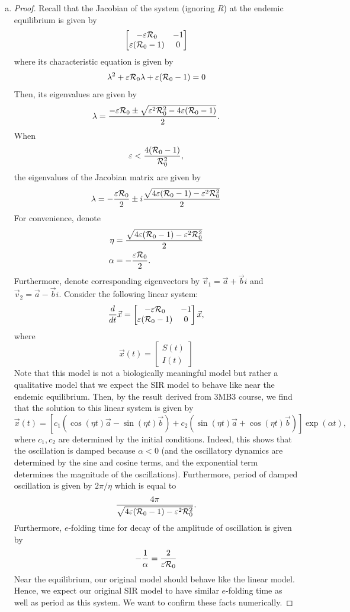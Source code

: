 \documentclass[12pt]{article}\usepackage[]{graphicx}\usepackage[]{color}
\begin{document}
\begin{enumerate}[(a)]
\item \SIRi
{\color{blue}\begin{proof}{\color{magenta}
Recall that the Jacobian of the system (ignoring $R$) at the endemic equilibrium is given by
$$
\begin{bmatrix}
- \varepsilon {\cal R}_0 & - 1 \\
\varepsilon ({\cal R}_0 - 1) & 0
\end{bmatrix}
$$
where its characteristic equation is given by
$$
\lambda^2 + \varepsilon {\cal R}_0 \lambda + \varepsilon({\cal R}_0 - 1) = 0
$$
Then, its eigenvalues are given by
$$
\lambda = \frac{-\varepsilon {\cal R}_0 \pm \sqrt{\varepsilon^2 {\cal R}_0^2 - 4 \varepsilon({\cal R}_0 - 1)}}{2}.
$$
When
$$
\varepsilon < \frac{4 ({\cal R}_0 - 1)}{{\cal R}_0^2},
$$
the eigenvalues of the Jacobian matrix are given by
$$
\lambda = -\frac{\varepsilon {\cal R}_0}{2} \pm i \frac{\sqrt{4 \varepsilon ({\cal R}_0 - 1) - \varepsilon^2 {\cal R}_0^2}}{2}
$$
For convenience, denote
$$
\begin{aligned}
\eta &= \frac{\sqrt{4 \varepsilon ({\cal R}_0 - 1) - \varepsilon^2 {\cal R}_0^2}}{2}\\
\alpha &= -\frac{\varepsilon {\cal R}_0}{2}.
\end{aligned}
$$
Furthermore, denote corresponding eigenvectors by $\vec{v}_1 = \vec{a} + \vec{b} i$ and $\vec{v}_2 = \vec{a} - \vec{b} i$.
Consider the following linear system:
$$
\frac{d}{dt} \vec{x} = \begin{bmatrix}
- \varepsilon {\cal R}_0 & - 1 \\
\varepsilon ({\cal R}_0 - 1) & 0
\end{bmatrix} \vec{x},
$$
where
$$
\vec{x}(t) = \begin{bmatrix}
S(t)\\
I(t)
\end{bmatrix}
$$
Note that this model is not a biologically meaningful model but rather a qualitative model that we expect the SIR model to behave like near the endemic equilibrium.
Then, by the result derived from 3MB3 course, we find that the solution to this linear system is given by
$$
\vec{x}(t) = \left[c_1 \left(\cos (\eta t) \vec{a} - \sin (\eta t) \vec{b} \right) + c_2 \left(\sin (\eta t) \vec{a} + \cos (\eta t) \vec{b} \right)  \right] \exp(\alpha t),
$$
where $c_1, c_2$ are determined by the initial conditions.
Indeed, this shows that the oscillation is damped because $\alpha < 0$ (and the oscillatory dynamics are determined by the sine and cosine terms, and the exponential term determines the magnitude of the oscillations). Furthermore, period of damped oscillation is given by $2\pi/\eta$ which is equal to
$$
\frac{4\pi}{\sqrt{4 \varepsilon ({\cal R}_0 - 1) - \varepsilon^2 {\cal R}_0^2}}.
$$
Furthermore, $e$-folding time for decay of the amplitude of oscillation is given by
$$
-\frac{1}{\alpha} = \frac{2}{\varepsilon {\cal R}_0}
$$
Near the equilibrium, our original model should behave like the linear model.
Hence, we expect our original SIR model to have similar $e$-folding time as well as period as this system.
We want to confirm these facts numerically.

}
\end{proof}}
\end{enumerate}
\end{document}
